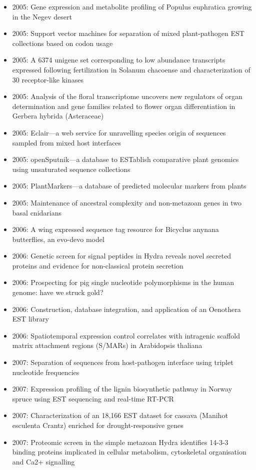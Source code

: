 \begin{itemize}
\item 2005: Gene expression and metabolite profiling of Populus euphratica growing in the Negev desert
\item 2005: Support vector machines for separation of mixed plant-pathogen EST collections based on codon usage
\item 2005: A 6374 unigene set corresponding to low abundance transcripts expressed following fertilization in Solanum chacoense and characterization of 30 receptor-like kinases
\item 2005: Analysis of the floral transcriptome uncovers new regulators of organ determination and gene families related to flower organ differentiation in Gerbera hybrida (Asteraceae)
\item 2005: Eclair---a web service for unravelling species origin of sequences sampled from mixed host interfaces
\item 2005: openSputnik---a database to ESTablish comparative plant genomics using unsaturated sequence collections
\item 2005: PlantMarkers---a database of predicted molecular markers from plants
\item 2005: Maintenance of ancestral complexity and non-metazoan genes in two basal cnidarians
\item 2006: A wing expressed sequence tag resource for Bicyclus anynana butterflies, an evo-devo model
\item 2006: Genetic screen for signal peptides in Hydra reveals novel secreted proteins and evidence for non-classical protein secretion
\item 2006: Prospecting for pig single nucleotide polymorphisms in the human genome: have we struck gold?
\item 2006: Construction, database integration, and application of an Oenothera EST library
\item 2006: Spatiotemporal expression control correlates with intragenic scaffold matrix attachment regions (S/MARs) in Arabidopsis thaliana
\item 2007: Separation of sequences from host-pathogen interface using triplet nucleotide frequencies
\item 2007: Expression profiling of the lignin biosynthetic pathway in Norway spruce using EST sequencing and real-time RT-PCR
\item 2007: Characterization of an 18,166 EST dataset for cassava (Manihot esculenta Crantz) enriched for drought-responsive genes
\item 2007: Proteomic screen in the simple metazoan Hydra identifies 14-3-3 binding proteins implicated in cellular metabolism, cytoskeletal organisation and Ca2+ signalling

\end{itemize}
